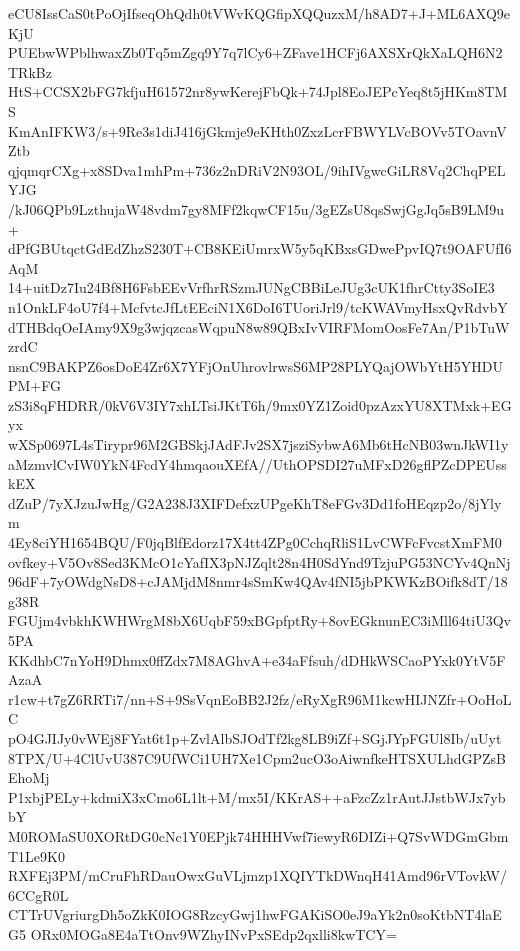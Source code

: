eCU8IssCaS0tPoOjIfseqOhQdh0tVWvKQGfipXQQuzxM/h8AD7+J+ML6AXQ9eKjU
PUEbwWPblhwaxZb0Tq5mZgq9Y7q7lCy6+ZFave1HCFj6AXSXrQkXaLQH6N2TRkBz
HtS+CCSX2bFG7kfjuH61572nr8ywKerejFbQk+74Jpl8EoJEPcYeq8t5jHKm8TMS
KmAnIFKW3/s+9Re3s1diJ416jGkmje9eKHth0ZxzLcrFBWYLVcBOVv5TOavnVZtb
qjqmqrCXg+x8SDva1mhPm+736z2nDRiV2N93OL/9ihIVgwcGiLR8Vq2ChqPELYJG
/kJ06QPb9LzthujaW48vdm7gy8MFf2kqwCF15u/3gEZsU8qsSwjGgJq5sB9LM9u+
dPfGBUtqctGdEdZhzS230T+CB8KEiUmrxW5y5qKBxsGDwePpvIQ7t9OAFUfI6AqM
14+uitDz7Iu24Bf8H6FsbEEvVrfhrRSzmJUNgCBBiLeJUg3cUK1fhrCtty3SoIE3
n1OnkLF4oU7f4+McfvtcJfLtEEciN1X6DoI6TUoriJrl9/tcKWAVmyHsxQvRdvbY
dTHBdqOeIAmy9X9g3wjqzcasWqpuN8w89QBxIvVIRFMomOosFe7An/P1bTuWzrdC
nsnC9BAKPZ6osDoE4Zr6X7YFjOnUhrovlrwsS6MP28PLYQajOWbYtH5YHDUPM+FG
zS3i8qFHDRR/0kV6V3IY7xhLTsiJKtT6h/9mx0YZ1Zoid0pzAzxYU8XTMxk+EGyx
wXSp0697L4sTirypr96M2GBSkjJAdFJv2SX7jsziSybwA6Mb6tHcNB03wnJkWI1y
aMzmvlCvIW0YkN4FcdY4hmqaouXEfA//UthOPSDI27uMFxD26gflPZcDPEUsskEX
dZuP/7yXJzuJwHg/G2A238J3XIFDefxzUPgeKhT8eFGv3Dd1foHEqzp2o/8jYlym
4Ey8ciYH1654BQU/F0jqBlfEdorz17X4tt4ZPg0CchqRliS1LvCWFcFvcstXmFM0
ovfkey+V5Ov8Sed3KMcO1cYafIX3pNJZqlt28n4H0SdYnd9TzjuPG53NCYv4QnNj
96dF+7yOWdgNsD8+cJAMjdM8nmr4sSmKw4QAv4fNI5jbPKWKzBOifk8dT/18g38R
FGUjm4vbkhKWHWrgM8bX6UqbF59xBGpfptRy+8ovEGknunEC3iMll64tiU3Qv5PA
KKdhbC7nYoH9Dhmx0ffZdx7M8AGhvA+e34aFfsuh/dDHkWSCaoPYxk0YtV5FAzaA
r1cw+t7gZ6RRTi7/nn+S+9SsVqnEoBB2J2fz/eRyXgR96M1kcwHIJNZfr+OoHoLC
pO4GJIJy0vWEj8FYat6t1p+ZvlAlbSJOdTf2kg8LB9iZf+SGjJYpFGUl8Ib/uUyt
8TPX/U+4ClUvU387C9UfWCi1UH7Xe1Cpm2ucO3oAiwnfkeHTSXULhdGPZsBEhoMj
P1xbjPELy+kdmiX3xCmo6L1lt+M/mx5I/KKrAS++aFzcZz1rAutJJstbWJx7ybbY
M0ROMaSU0XORtDG0cNc1Y0EPjk74HHHVwf7iewyR6DIZi+Q7SvWDGmGbmT1Le9K0
RXFEj3PM/mCruFhRDauOwxGuVLjmzp1XQIYTkDWnqH41Amd96rVTovkW/6CCgR0L
CTTrUVgriurgDh5oZkK0IOG8RzcyGwj1hwFGAKiSO0eJ9aYk2n0soKtbNT4laEG5
ORx0MOGa8E4aTtOnv9WZhyINvPxSEdp2qxlli8kwTCY=
